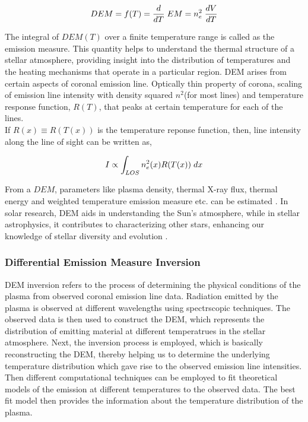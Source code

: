 \message{ !name(main.tex)}\documentclass[12pt]{article}
\begin{document}
\vspace{-.75cm}
\everymath{\displaystyle}
\begin{center}
    \begin{equation*}
        DEM = f(T) = \frac{d}{dT}\hspace{0.1cm} EM = n_e^2 \hspace{0.1cm} \frac{dV}{dT}
    \end{equation*}
\end{center}

The integral of $DEM(T)$ over a finite temperature range is called as the emission measure. This quantity helps to understand the thermal structure of a stellar atmosphere, providing insight into the distribution of temperatures and the heating mechanisms that operate in a particular region. DEM arises from certain aspects of coronal emission line. Optically thin property of corona, scaling of emission line intensity with density squared $n^2$(for most lines) and temperature response function, $R(T)$, that peaks at certain temperature for each of the lines.\\

If $R(x) \equiv R(T(x))$ is the temperature reponse function, then, line intensity along the line of sight can be written as,

\vspace{-.75cm}
\begin{center}
    \begin{equation*}
        I \propto \int_{LOS} n_e^2(x) R(T(x)) \hspace{0.1cm} dx
    \end{equation*}
\end{center}

From a $DEM$, parameters like plasma density, thermal X-ray flux, thermal energy and weighted temperature emission measure etc. can be estimated \citep{Su2018-fq}. In solar research, DEM aids in understanding the Sun's atmosphere, while in stellar astrophysics, it contributes to characterizing other stars, enhancing our knowledge of stellar diversity and evolution \citep{Namekata2023-rq}.

\subsubsection{Differential Emission Measure Inversion}

DEM inversion refers to the process of determining the physical conditions of the plasma from observed coronal emission line data. Radiation emitted by the plasma is observed at different wavelengths using spectrscopic techniques. The observed data is then used to construct the DEM, which represents the distribution of emitting material at different temperatrues in the stellar atmosphere. Next, the inversion process is employed, which is basically reconstructing the DEM, thereby helping us to determine the underlying temperature distribution which gave rise to the observed emission line intensities. Then different computational techniques can be employed to fit theoretical models of the emission at different temperatures to the observed data. The best fit model then provides the information about the temperature distribution of the plasma.\\
\end{document}
